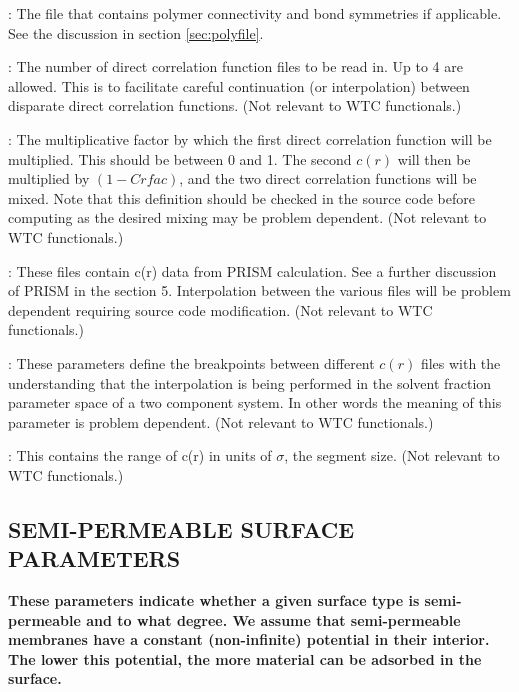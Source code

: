\documentclass[10pt,onecolumn]{article}
\begin{document}
\vspace{0.1in}
: The file that contains polymer connectivity
                        and bond symmetries if applicable.  See
                        the discussion in section \ref{sec:polyfile}.

\vspace{0.1in}
: The number of direct correlation function files
to be read in.  Up to 4 are allowed.  This is to facilitate careful continuation (or interpolation) between disparate direct correlation functions. (Not relevant to WTC functionals.)

\vspace{0.1in}
: The multiplicative factor by which the first direct correlation function
will be multiplied.  This should be between 0 and 1.  The second $c(r)$ will then be
multiplied by $(1-Crfac)$, and the two direct correlation functions will be mixed.  Note that this definition should be checked in the source code before computing as the desired mixing may be problem dependent.  (Not relevant to WTC functionals.)

\vspace{0.1in}
: These files contain c(r) data from PRISM
                    calculation.  See a further discussion of PRISM in the
                    section 5.  Interpolation between the various files will be problem dependent requiring source code modification.  (Not relevant to WTC functionals.)
                    
\vspace{0.1in}
: These parameters define the breakpoints between different $c(r)$ files with the understanding that the interpolation is being performed in the solvent fraction parameter space of a two component system.  In other words the meaning of this parameter is problem dependent.  (Not relevant to WTC functionals.)
                    
\vspace{0.1in}
: This contains the range of c(r) in units of
                       $\sigma$, the segment size.  (Not relevant to WTC functionals.)


\vfill
\break

\subsection{SEMI-PERMEABLE SURFACE PARAMETERS}
{\bf
These parameters indicate whether a given surface type is
semi-permeable and to what degree.  We assume that semi-permeable
membranes have a constant (non-infinite) potential in their
interior.  The lower this potential, the more material can
be adsorbed in the surface.}
\end{document}
